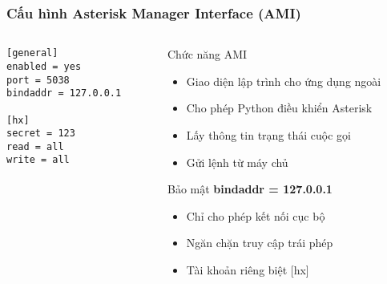 \begin{frame}[fragile]
\frametitle{Cấu hình Asterisk Manager Interface (AMI)}

\begin{columns}[t]
\begin{column}{0.5\textwidth}
\begin{verbatim}
[general]
enabled = yes
port = 5038
bindaddr = 127.0.0.1

[hx]
secret = 123
read = all
write = all
\end{verbatim}
\end{column}

\begin{column}{0.45\textwidth}
\begin{block}{Chức năng AMI}
\begin{itemize}
\item Giao diện lập trình cho ứng dụng ngoài
\item Cho phép Python điều khiển Asterisk
\item Lấy thông tin trạng thái cuộc gọi
\item Gửi lệnh từ máy chủ
\end{itemize}
\end{block}

\begin{alertblock}{Bảo mật}
\textbf{bindaddr = 127.0.0.1}
\begin{itemize}
\item Chỉ cho phép kết nối cục bộ
\item Ngăn chặn truy cập trái phép
\item Tài khoản riêng biệt [hx]
\end{itemize}
\end{alertblock}
\end{column}
\end{columns}

\end{frame}
